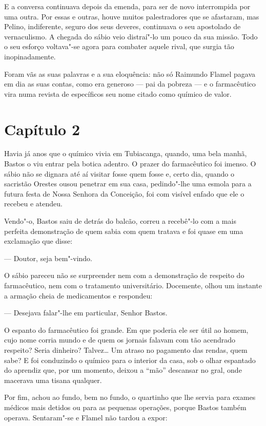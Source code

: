 E a conversa continuava depois da emenda, para ser de novo interrompida
por uma outra. Por essas e outras, houve muitos palestradores que se
afastaram, mas Pelino, indiferente, seguro dos seus deveres, continuava
o seu apostolado de vernaculismo. A chegada do sábio veio distraí"-lo um
pouco da sua missão. Todo o seu esforço voltava"-se agora para combater
aquele rival, que surgia tão inopinadamente.

Foram vãs as suas palavras e a sua eloquência: não só Raimundo Flamel
pagava em dia as suas contas, como era generoso --- pai da pobreza --- e
o farmacêutico vira numa revista de específicos seu nome citado como
químico de valor.

\section{Capítulo 2}

Havia já anos que o químico vivia em Tubiacanga, quando, uma bela manhã,
Bastos o viu entrar pela botica adentro. O prazer do farmacêutico foi
imenso. O sábio não se dignara até aí visitar fosse quem fosse e, certo
dia, quando o sacristão Orestes ousou penetrar em sua casa, pedindo"-lhe
uma esmola para a futura festa de Nossa Senhora da Conceição, foi com
visível enfado que ele o recebeu e atendeu.

Vendo"-o, Bastos saiu de detrás do balcão, correu a recebê"-lo com a mais
perfeita demonstração de quem sabia com quem tratava e foi quase em uma
exclamação que disse:

--- Doutor, seja bem"-vindo.

O sábio pareceu não se surpreender nem com a demonstração de respeito do
farmacêutico, nem com o tratamento universitário. Docemente, olhou um
instante a armação cheia de medicamentos e respondeu:

--- Desejava falar"-lhe em particular, Senhor Bastos.

O espanto do farmacêutico foi grande. Em que poderia ele ser útil ao
homem, cujo nome corria mundo e de quem os jornais falavam com tão
acendrado respeito? Seria dinheiro? Talvez\ldots{} Um atraso no pagamento das
rendas, quem sabe? E foi conduzindo o químico para o interior da casa,
sob o olhar espantado do aprendiz que, por um momento, deixou a ``mão''
descansar no gral, onde macerava uma tisana qualquer.

Por fim, achou ao fundo, bem no fundo, o quartinho que lhe servia para
exames médicos mais detidos ou para as pequenas operações, porque Bastos
também operava. Sentaram"-se e Flamel não tardou a expor:

